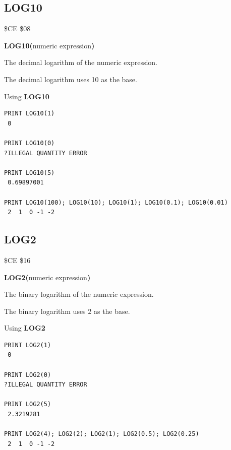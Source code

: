 \subsection{LOG10}
\begin{description}[leftmargin=2cm,style=nextline]
\item [Token:]    \$CE \$08

\item [Format:]   {\bf LOG10(}numeric expression{\bf)}

\item [Returns:]  The decimal logarithm of the numeric expression.

                  The decimal logarithm uses 10 as the base.

\item [Examples:] Using {\bf LOG10}

\begin{tcolorbox}[colback=black,coltext=white]
\verbatimfont{\codefont}
\begin{verbatim}
PRINT LOG10(1)
 0

PRINT LOG10(0)
?ILLEGAL QUANTITY ERROR

PRINT LOG10(5)
 0.69897001

PRINT LOG10(100); LOG10(10); LOG10(1); LOG10(0.1); LOG10(0.01)
 2  1  0 -1 -2
\end{verbatim}
\end{tcolorbox}
\end{description}


\newpage
\subsection{LOG2}
\begin{description}[leftmargin=2cm,style=nextline]
\item [Token:]    \$CE \$16

\item [Format:]   {\bf LOG2(}numeric expression{\bf)}

\item [Returns:]  The binary logarithm of the numeric expression.

                  The binary logarithm uses 2 as the base.

\item [Examples:] Using {\bf LOG2}

\begin{tcolorbox}[colback=black,coltext=white]
\verbatimfont{\codefont}
\begin{verbatim}
PRINT LOG2(1)
 0

PRINT LOG2(0)
?ILLEGAL QUANTITY ERROR

PRINT LOG2(5)
 2.3219281

PRINT LOG2(4); LOG2(2); LOG2(1); LOG2(0.5); LOG2(0.25)
 2  1  0 -1 -2
\end{verbatim}
\end{tcolorbox}
\end{description}


